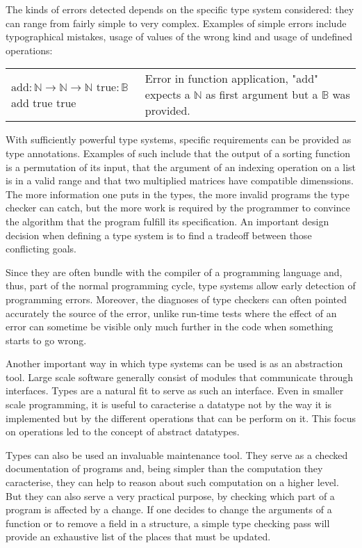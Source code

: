 The kinds of errors detected depends on the specific type system considered: they can range from
fairly simple to very complex. Examples of simple errors include typographical mistakes, usage of
values of the wrong kind and usage of undefined operations:

\begin{center}
  \begin{tabular}{m{3.5cm} | m{5.5cm}}
    $\text{add} : \mathbb{N} \to \mathbb{N} \to \mathbb{N}$ \newline
    $\text{true} : \mathbb{B}$ \newline
    add true true
    & Error in function application, "add" expects a $\mathbb{N}$ as first argument but a
    $\mathbb{B}$ was provided.
  \end{tabular}
\end{center}

With sufficiently powerful type systems, specific requirements can be provided as type annotations.
Examples of such include that the output of a sorting function is a permutation of its input, that
the argument of an indexing operation on a list is in a valid range and that two multiplied matrices
have compatible dimenssions. The more information one puts in the types, the more invalid programs
the type checker can catch, but the more work is required by the programmer to convince the
algorithm that the program fulfill its specification. An important design decision when defining
a type system is to find a tradeoff between those conflicting goals.

Since they are often bundle with the compiler of a programming language and, thus, part of the
normal programming cycle, type systems allow early detection of programming errors. Moreover, the
diagnoses of type checkers can often pointed accurately the source of the error, unlike run-time
tests where the effect of an error can sometime be visible only much further in the code when
something starts to go wrong.

Another important way in which type systems can be used is as an abstraction tool. Large scale
software generally consist of modules that communicate through interfaces. Types are a natural fit
to serve as such an interface. Even in smaller scale programming, it is useful to caracterise a
datatype not by the way it is implemented but by the different operations that can be perform on it.
This focus on operations led to the concept of abstract datatypes.

Types can also be used an invaluable maintenance tool. They serve as a checked documentation of
programs and, being simpler than the computation they caracterise, they can help to reason about
such computation on a higher level. But they can also serve a very practical purpose, by checking
which part of a program is affected by a change. If one decides to change the arguments of a
function or to remove a field in a structure, a simple type checking pass will provide an exhaustive
list of the places that must be updated.

